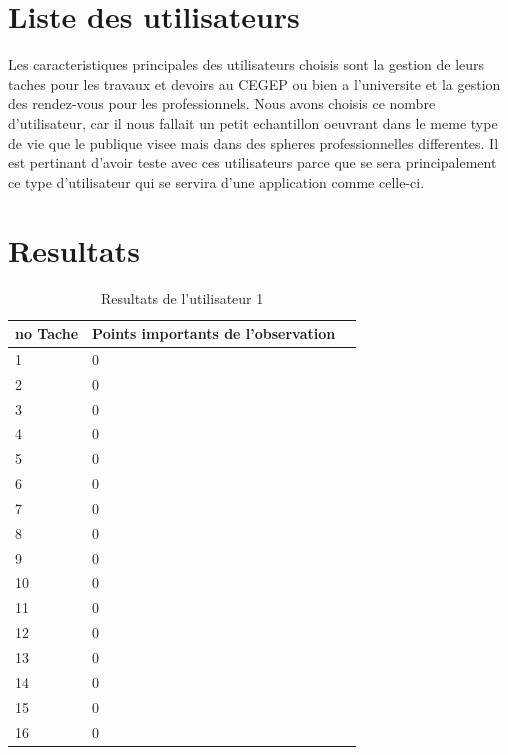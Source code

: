 \documentclass[letterpaper, oneside, 12pt, these, creativecommons]{thETS}
\begin{document}
\section{Liste des utilisateurs}

Les caracteristiques principales des utilisateurs choisis sont la gestion de leurs taches pour les travaux et devoirs au CEGEP ou bien a l'universite et la gestion des rendez-vous pour les professionnels. Nous avons choisis ce nombre d'utilisateur, car il nous fallait un petit echantillon oeuvrant dans le meme type de vie que le publique visee mais dans des spheres professionnelles differentes. Il est pertinant d'avoir teste avec ces utilisateurs parce que se sera principalement ce type d'utilisateur qui se servira d'une application comme celle-ci.

\newpage

\section{Resultats}

\begin{table}
	\centering
	\begin{tabular}{|l|l|l|}
	\hline
	no Tache	& Points importants de l'observation	\\ \hline
	1		& 0						\\ \hline
	2		& 0						\\ \hline
	3		& 0						\\ \hline
	4		& 0						\\ \hline
	5		& 0						\\ \hline
	6		& 0						\\ \hline
	7		& 0						\\ \hline
	8		& 0						\\ \hline
	9		& 0						\\ \hline
	10		& 0						\\ \hline
	11		& 0						\\ \hline
	12		& 0						\\ \hline
	13		& 0						\\ \hline
	14		& 0						\\ \hline
	15		& 0						\\ \hline
	16		& 0						\\ \hline
	\end{tabular}
	\caption{Resultats de l'utilisateur 1}
\end{table}

\newpage
\end{document}
